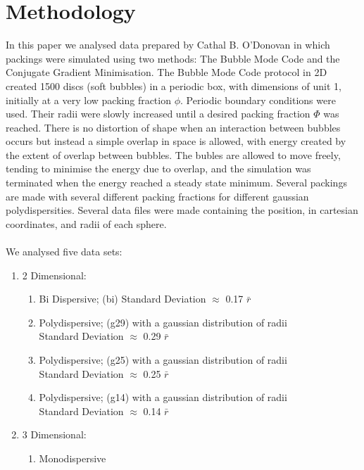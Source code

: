 \documentclass[12pt] {article} %
\begin{document}
\section{Methodology}
In this paper we analysed data prepared by Cathal B. O'Donovan \cite{cathal} in which packings were simulated using two methods: The Bubble Mode Code and the Conjugate Gradient Minimisation. The Bubble Mode Code protocol in 2D created 1500 discs (soft bubbles) in a periodic box, with dimensions of unit 1, initially at a very low packing fraction $\phi$. Periodic boundary conditions were used. Their radii were slowly increased until a desired packing fraction $\varPhi$ was reached. There is no distortion of shape when an interaction between bubbles occurs but instead a simple overlap in space is allowed, with energy created by the extent of overlap between bubbles. The bubles are allowed to move freely, tending to minimise the energy due to overlap, and the simulation was terminated when the energy reached a steady state minimum. Several packings are made with several different packing fractions for different gaussian polydispersities. Several data files were made containing the position, in cartesian coordinates, and radii of each sphere. \\
\\
We analysed five data sets:
\begin{enumerate}
	\item 2 Dimensional:
		\begin{enumerate}
			\item Bi Dispersive; (bi) Standard Deviation $\approx$ 0.17 $\bar{r}$
			\item Polydispersive; (g29) with a gaussian distribution of radii\\ Standard Deviation $\approx$ 0.29 $\bar{r}$
			\item Polydispersive; (g25) with a gaussian distribution of radii\\ Standard Deviation $\approx$ 0.25 $\bar{r}$
			\item Polydispersive; (g14) with a gaussian distribution of radii\\ Standard Deviation $\approx$ 0.14 $\bar{r}$
		\end{enumerate}
	\item 3 Dimensional:
		\begin{enumerate}
			\item Monodispersive
		\end{enumerate}
\end{enumerate}
\end{document}
